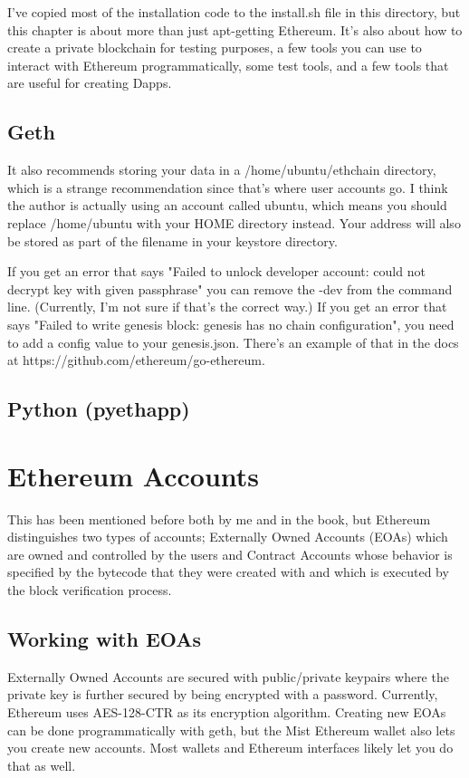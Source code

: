 \documentclass{article}
\begin{document}
I've copied most of the installation code to the install.sh file in this directory, but this chapter is about more than just apt-getting Ethereum. It's also about how to create a private blockchain for testing purposes, a few tools you can use to interact with Ethereum programmatically, some test tools, and a few tools that are useful for creating Dapps.

\subsection{Geth}
It also recommends storing your data in a /home/ubuntu/ethchain directory, which is a strange recommendation since that's where user accounts go. I think the author is actually using an account called ubuntu, which means you should replace /home/ubuntu with your HOME directory instead. Your address will also be stored as part of the filename in your keystore directory.

If you get an error that says "Failed to unlock developer account: could not decrypt key with given passphrase" you can remove the -dev from the command line.  (Currently, I'm not sure if that's the correct way.) If you get an error that says "Failed to write genesis block: genesis has no chain configuration", you need to add a config value to your genesis.json. There's an example of that
in the docs at https://github.com/ethereum/go-ethereum.


\subsection{Python (pyethapp)}

\section{Ethereum Accounts}
This has been mentioned before both by me and in the book, but Ethereum distinguishes two types of accounts; Externally Owned Accounts (EOAs) which are owned and controlled by the users and Contract Accounts whose behavior is specified by the bytecode that they were created with and which is executed by the block verification process.

\subsection{Working with EOAs}
Externally Owned Accounts are secured with public/private keypairs where the private key is further secured by being encrypted with a password. Currently, Ethereum uses AES-128-CTR as its encryption algorithm. Creating new EOAs can be done programmatically with geth, but the Mist Ethereum wallet also lets you create new accounts. Most wallets and Ethereum interfaces likely let you do that as well.
\end{document}
